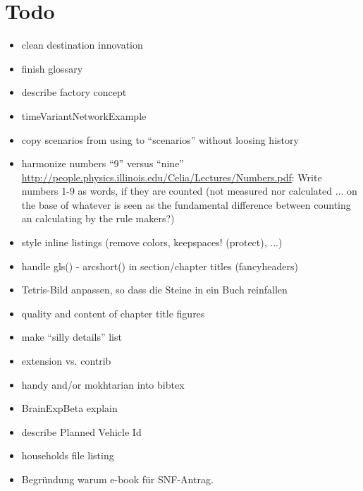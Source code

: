 \section*{Todo}

\begin{itemize}\styleItemize

\item clean destination innovation

\item finish glossary

\item describe factory concept

\item timeVariantNetworkExample

\item copy scenarios from using to ``scenarios'' without loosing history

\item harmonize numbers ``9'' versus ``nine'' \url{http://people.physics.illinois.edu/Celia/Lectures/Numbers.pdf}: Write numbers 1-9 as words, if they are counted (not measured nor calculated ... on the base of whatever is seen as the fundamental difference between counting an calculating by the rule makers?)

\item style inline listings (remove colors, keepspaces! (protect), ...)

\item handle gls() - arcshort() in section/chapter titles (fancyheaders)

\item Tetris-Bild anpassen, so dass die Steine in ein Buch reinfallen

\item quality and content of chapter title figures

\item make ``silly details'' list

\item extension vs. contrib

\item handy and/or mokhtarian into bibtex

\item BrainExpBeta explain

\item describe Planned Vehicle Id

\item households file listing

\item Begründung warum e-book für SNF-Antrag.


\end{itemize}
